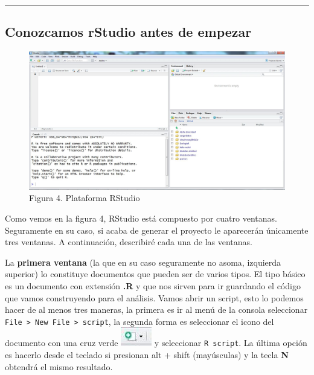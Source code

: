 \documentclass[]{article}
\begin{document}
\begin{center}\rule{0.5\linewidth}{\linethickness}\end{center}

\subsection{Conozcamos rStudio antes de
empezar}\label{conozcamos-rstudio-antes-de-empezar}

\begin{figure}[htbp]
\centering
\includegraphics{imagen/RStudio.jpg}
\caption{Figura 4. Plataforma RStudio}
\end{figure}

Como vemos en la figura 4, RStudio está compuesto por cuatro ventanas.
Seguramente en su caso, si acaba de generar el proyecto le aparecerán
únicamente tres ventanas. A continuación, describiré cada una de las
ventanas.

La \textbf{primera ventana} (la que en su caso seguramente no asoma,
izquierda superior) lo constituye documentos que pueden ser de varios
tipos. El tipo básico es un documento con extensión \textbf{.R} y que
nos sirven para ir guardando el código que vamos construyendo para el
análisis. Vamos abrir un script, esto lo podemos hacer de al menos tres
maneras, la primera es ir al menú de la consola seleccionar
\texttt{File\ \textgreater{}\ New\ File\ \textgreater{}\ script}, la
segunda forma es seleccionar el icono del documento con una cruz verde
\includegraphics{imagen/RStudio_nuevo.jpg} y seleccionar
\texttt{R\ script}. La última opción es hacerlo desde el teclado si
presionan alt + shift (mayúsculas) y la tecla \textbf{N} obtendrá el
mismo resultado.
\end{document}
